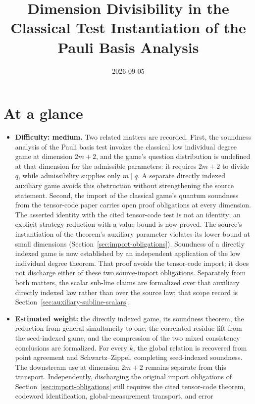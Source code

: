 \documentclass[11pt]{article}
\title{Dimension Divisibility in the Classical Test Instantiation of the
	Pauli Basis Analysis}
\author{}
\date{2026-09-05}
\begin{document}
\maketitle

\section{At a glance}

\begin{itemize}
  \item \textbf{Difficulty: medium.}  Two related matters are recorded.
  First, the soundness analysis of the Pauli basis test invokes the
  classical low individual degree game at dimension $2m+2$, and the game's
  question distribution is undefined at that dimension for the admissible
  parameters: it requires $2m+2$ to divide $q$, while admissibility supplies
  only $m \mid q$.  A separate directly indexed auxiliary game avoids this
  obstruction without strengthening the source statement.  Second, the
  import of the classical
  game's quantum soundness from the tensor-code paper carries open proof
  obligations at every dimension. The asserted identity with
  the cited tensor-code test is not an identity; an explicit strategy
  reduction with a value bound is now proved. The source's instantiation of the
  theorem's auxiliary parameter violates its lower bound at small
  dimensions (Section~\ref{sec:import-obligations}).  Soundness of a directly
  indexed game is now established by an independent application of the low
  individual degree theorem.  That proof avoids the tensor-code import; it
  does not discharge either of these two source-import obligations.
  Separately from both matters, the scalar sub-line claims are formalized
  over that auxiliary directly indexed law rather than over the source law;
  that scope record is Section~\ref{sec:auxiliary-subline-scalars}.
  \item \textbf{Estimated weight:} the directly indexed game, its soundness
  theorem, the reduction from general simultaneity to one, the correlated
  residue lift from the seed-indexed game, and the compression of the two
  mixed consistency conclusions are formalized. For every $k$, the global
  relation is recovered from point agreement and Schwartz--Zippel, completing
  seed-indexed soundness. The downstream use at dimension $2m+2$ remains
  separate from this transport. Independently, discharging
  the original import obligations of
  Section~\ref{sec:import-obligations} still requires the cited tensor-code
  theorem, codeword identification, global-measurement transport, and error

\end{itemize}
\end{document}
